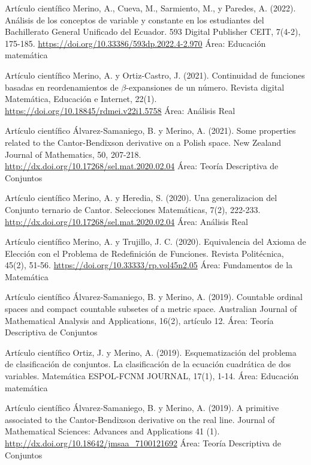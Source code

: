 \documentclass[
	a4paper,
	maincolor=cvblue!70!blue,
	sidecolor=gray!30,
	sectioncolor=cvblue!70!blue,
    sidebarwidth=7.5cm,
	topbottommargin=20pt,
	leftrightmargin=20pt,
]{fortysecondscv}
\begin{document}
    {Artículo científico}
    {Merino, A., Cueva, M., Sarmiento, M., y Paredes, A. (2022). Análisis de los conceptos de variable y constante en los estudiantes del Bachillerato General Unificado del Ecuador. 593 Digital Publisher CEIT, 7(4-2), 175-185.}     
    {\url{https://doi.org/10.33386/593dp.2022.4-2.970}}
    {Área: Educación matemática}
    
    {Artículo científico}
    {Merino, A. y Ortiz-Castro, J. (2021). Continuidad de funciones basadas en reordenamientos de $\beta$-expansiones de un número. Revista digital Matemática, Educación e Internet, 22(1).}     
    {\url{https://doi.org/10.18845/rdmei.v22i1.5758}}
    {Área: Análisis Real}
    
    {Artículo científico}
    {Álvarez-Samaniego, B. y Merino, A. (2021). Some properties related to the Cantor-Bendixson derivative on a Polish space. New Zealand Journal of Mathematics, 50, 207-218.}     {\url{http://dx.doi.org/10.17268/sel.mat.2020.02.04}}
    {Área: Teoría Descriptiva de Conjuntos}
    
    {Artículo científico}
    {Merino, A. y Heredia, S. (2020). Una generalizacion del Conjunto ternario de Cantor. Selecciones Matemáticas, 7(2), 222-233.}     {\url{http://dx.doi.org/10.17268/sel.mat.2020.02.04}}
    {Área: Análisis Real}
    
    {Artículo científico}
    {Merino, A. y Trujillo, J. C. (2020). Equivalencia del Axioma de Elección con el Problema de Redefinición de Funciones. Revista Politécnica, 45(2), 51-56.}     {\url{https://doi.org/10.33333/rp.vol45n2.05}}
    {Área: Fundamentos de la Matemática}
    
    {Artículo científico}
    {Álvarez-Samaniego, B. y Merino, A. (2019). Countable ordinal spaces and compact countable subsetes of a metric space. Australian Journal of Mathematical Analysis and Applications, 16(2), artículo 12.}
    {}
    {Área: Teoría Descriptiva de Conjuntos}
    
    {Artículo científico}
    {Ortiz, J. y Merino, A. (2019). Esquematización del problema de clasificación de conjuntos. La clasificación de la ecuación cuadrática de dos variables. Matemática ESPOL-FCNM JOURNAL, 17(1), 1-14.}
    {}
    {Área: Educación matemática}
    
    {Artículo científico}
    {Álvarez-Samaniego, B. y Merino, A. (2019). A primitive associated to the Cantor-Bendixson derivative on the real line. Journal of Mathematical Sciences: Advances and Applications 41 (1).}     
    {\url{http://dx.doi.org/10.18642/jmsaa_7100121692}}
    {Área: Teoría Descriptiva de Conjuntos}
    
\end{document}
